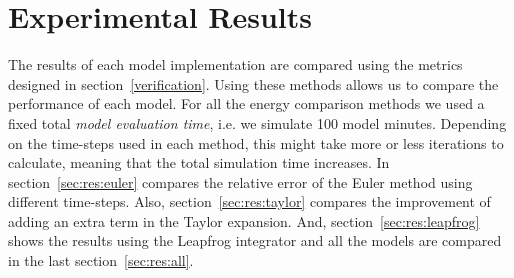 \documentclass[11pt]{article} %
\begin{document}
\section{Experimental Results}
\label{sec:results}
The results of each model implementation are compared using the metrics designed in section~\ref{verification}. Using these methods allows us to compare the performance of each model. For all the energy comparison methods we used a fixed total \textit{model evaluation time}, i.e. we simulate 100 model minutes. Depending on the time-steps used in each method, this might take more or less iterations to calculate, meaning that the total simulation time increases. In
section~\ref{sec:res:euler} compares the relative error of the Euler method using different time-steps. Also, section~\ref{sec:res:taylor} compares the improvement of adding an extra term in the Taylor expansion. And, section~\ref{sec:res:leapfrog} shows the results using the Leapfrog integrator and all the models are compared in the last section~\ref{sec:res:all}.
\end{document}

